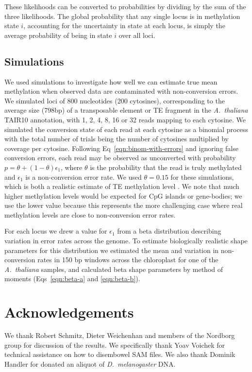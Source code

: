 \documentclass[10pt,draft,letterpaper]{article}
\begin{document}
These likelihoods can be converted to probabilities by dividing by the sum of the three likelihoods.
The global probability that any single locus is in methylation state $i$, accounting for the uncertainty in state at each locus, is simply the average probability of being in state $i$ over all loci.

\subsection*{Simulations}

We used simulations to investigate how well we can estimate true mean methylation when observed data are contaminated with non-conversion errors.
We simulated loci of 800 nucleotides (200 cytosines), corresponding to the average size (798bp) of a transposable element or TE fragment in the \textit{A.~thaliana} TAIR10 annotation, with 1, 2, 4, 8, 16 or 32 reads mapping to each cytosine.
We simulated the conversion state of each read at each cytosine as a binomial process with the total number of trials being the number of cytosines multiplied by coverage per cytosine.
Following Eq~\ref{eqn:binom-with-errors} and ignoring false conversion errors, each read may be observed as unconverted with probability $p=\theta + (1-\theta)\epsilon_1$, where $\theta$ is the probability that the read is truly methylated and $\epsilon_1$ is a non-conversion error rate.
We used $\theta=0.15$ for these simulations, which is both a realistic estimate of TE methylation level \cite{dubin2015dna}.
We note that much higher methylation levels would be expected for CpG islands or gene-bodies; we use the lower value because this represents the more challenging case where real methylation levels are close to non-conversion error rates.

For each locus we drew a value for $\epsilon_1$ from a beta distribution describing variation in error rates across the genome.
To estimate biologically realistic shape parameters for this distribution we estimated the mean and variation in non-conversion rates in 150 bp windows across the chloroplast for one of the \emph{A.~thaliana} samples, and calculated beta shape parameters by method of moments (Eqs~\ref{eqn:beta-a} and \ref{eqn:beta-b}).

\section*{Acknowledgements}

We thank Robert Schmitz, Dieter Weichenhan and members of the Nordborg group for discussion of the results.
We specifically thank Yoav Voichek for technical assistance on how to disembowel SAM files.
We also thank Dominik Handler for donated an aliquot of \emph{D.~melanogaster} DNA.
\end{document}
